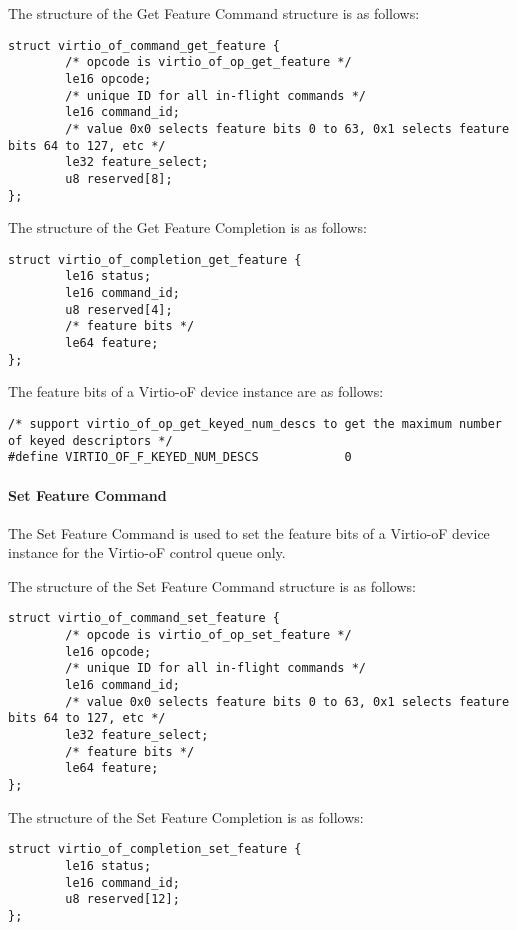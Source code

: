 The structure of the Get Feature Command structure is as follows:
\begin{lstlisting}
struct virtio_of_command_get_feature {
        /* opcode is virtio_of_op_get_feature */
        le16 opcode;
        /* unique ID for all in-flight commands */
        le16 command_id;
        /* value 0x0 selects feature bits 0 to 63, 0x1 selects feature bits 64 to 127, etc */
        le32 feature_select;
        u8 reserved[8];
};
\end{lstlisting}

The structure of the Get Feature Completion is as follows:
\begin{lstlisting}
struct virtio_of_completion_get_feature {
        le16 status;
        le16 command_id;
        u8 reserved[4];
        /* feature bits */
        le64 feature;
};
\end{lstlisting}

The feature bits of a Virtio-oF device instance are as follows:
\begin{lstlisting}
/* support virtio_of_op_get_keyed_num_descs to get the maximum number of keyed descriptors */
#define VIRTIO_OF_F_KEYED_NUM_DESCS            0
\end{lstlisting}

\paragraph{Set Feature Command}\label{sec:Virtio Transport Options / Virtio Over Fabrics / Commands Definition / Opcodes / Set Feature Command}
The Set Feature Command is used to set the feature bits of a Virtio-oF device instance for the Virtio-oF control queue only.

The structure of the Set Feature Command structure is as follows:
\begin{lstlisting}
struct virtio_of_command_set_feature {
        /* opcode is virtio_of_op_set_feature */
        le16 opcode;
        /* unique ID for all in-flight commands */
        le16 command_id;
        /* value 0x0 selects feature bits 0 to 63, 0x1 selects feature bits 64 to 127, etc */
        le32 feature_select;
        /* feature bits */
        le64 feature;
};
\end{lstlisting}

The structure of the Set Feature Completion is as follows:
\begin{lstlisting}
struct virtio_of_completion_set_feature {
        le16 status;
        le16 command_id;
        u8 reserved[12];
};
\end{lstlisting}


